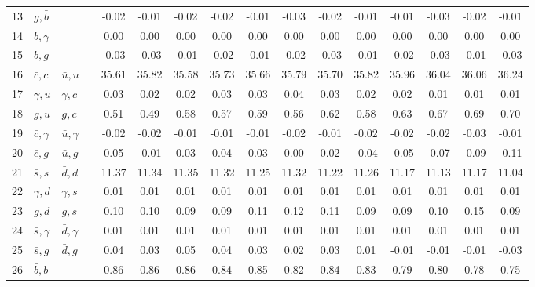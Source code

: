 \begin{tabularx}{\textwidth}{rXXX@{}S@{}S@{}S@{}S@{}S@{}S@{}S@{}S@{}S@{}S@{}S@{}S}
 13 & $g,\bar b$       &                  &                 & -0.02 & -0.01 & -0.02 & -0.02 & -0.01 & -0.03 & -0.02 & -0.01 & -0.01 & -0.03 & -0.02 & -0.01 \\
 14 & $b,\gamma$       &                  &                 &  0.00 &  0.00 &  0.00 &  0.00 &  0.00 &  0.00 &  0.00 &  0.00 &  0.00 &  0.00 &  0.00 &  0.00 \\
 15 & $b,g$            &                  &                 & -0.03 & -0.03 & -0.01 & -0.02 & -0.01 & -0.02 & -0.03 & -0.01 & -0.02 & -0.03 & -0.01 & -0.03 \\
 16 & $\bar c,c$       & $\bar u,u$       &                 & 35.61 & 35.82 & 35.58 & 35.73 & 35.66 & 35.79 & 35.70 & 35.82 & 35.96 & 36.04 & 36.06 & 36.24 \\
 17 & $\gamma, u$      & $\gamma, c$      &                 &  0.03 &  0.02 &  0.02 &  0.03 &  0.03 &  0.04 &  0.03 &  0.02 &  0.02 &  0.01 &  0.01 &  0.01 \\
 18 & $g,u$            & $g,c$            &                 &  0.51 &  0.49 &  0.58 &  0.57 &  0.59 &  0.56 &  0.62 &  0.58 &  0.63 &  0.67 &  0.69 &  0.70 \\
 19 & $\bar c,\gamma$  & $\bar u,\gamma$  &                 & -0.02 & -0.02 & -0.01 & -0.01 & -0.01 & -0.02 & -0.01 & -0.02 & -0.02 & -0.02 & -0.03 & -0.01 \\
 20 & $\bar c, g$      & $\bar u, g$      &                 &  0.05 & -0.01 &  0.03 &  0.04 &  0.03 &  0.00 &  0.02 & -0.04 & -0.05 & -0.07 & -0.09 & -0.11 \\
 21 & $\bar s, s$      & $\bar d, d$      &                 & 11.37 & 11.34 & 11.35 & 11.32 & 11.25 & 11.32 & 11.22 & 11.26 & 11.17 & 11.13 & 11.17 & 11.04 \\
 22 & $\gamma, d$      & $\gamma, s$      &                 &  0.01 &  0.01 &  0.01 &  0.01 &  0.01 &  0.01 &  0.01 &  0.01 &  0.01 &  0.01 &  0.01 &  0.01 \\
 23 & $g,d$            & $g,s$            &                 &  0.10 &  0.10 &  0.09 &  0.09 &  0.11 &  0.12 &  0.11 &  0.09 &  0.09 &  0.10 &  0.15 &  0.09 \\
 24 & $\bar s,\gamma$  & $\bar d,\gamma$  &                 &  0.01 &  0.01 &  0.01 &  0.01 &  0.01 &  0.01 &  0.01 &  0.01 &  0.01 &  0.01 &  0.01 &  0.01 \\
 25 & $\bar s,g$       & $\bar d, g$      &                 &  0.04 &  0.03 &  0.05 &  0.04 &  0.03 &  0.02 &  0.03 &  0.01 & -0.01 & -0.01 & -0.01 & -0.03 \\
 26 & $\bar b,b$       &                  &                 &  0.86 &  0.86 &  0.86 &  0.84 &  0.85 &  0.82 &  0.84 &  0.83 &  0.79 &  0.80 &  0.78 &  0.75 \\

\end{tabularx}
